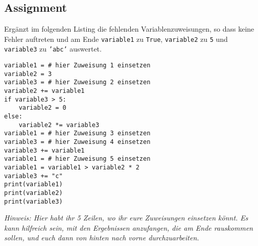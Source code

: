 \subsection{Assignment}
Ergänzt im folgenden Listing die fehlenden Variablenzuweisungen, so dass keine Fehler auftreten und am Ende \texttt{variable1} zu \texttt{True}, \texttt{variable2} zu \texttt{5} und \texttt{variable3} zu \texttt{'abc'} auswertet.
\begin{lstlisting}
variable1 = # hier Zuweisung 1 einsetzen
variable2 = 3
variable3 = # hier Zuweisung 2 einsetzen
variable2 += variable1
if variable3 > 5:
	variable2 = 0
else:
	variable2 *= variable3
variable1 = # hier Zuweisung 3 einsetzen
variable3 = # hier Zuweisung 4 einsetzen
variable3 += variable1
variable1 = # hier Zuweisung 5 einsetzen
variable1 = variable1 > variable2 * 2
variable3 += "c"
print(variable1)
print(variable2)
print(variable3)
\end{lstlisting}

\textit{Hinweis: Hier habt ihr 5 Zeilen, wo ihr eure Zuweisungen einsetzen könnt. Es kann hilfreich sein, mit den Ergebnissen anzufangen, die am Ende rauskommen sollen, und euch dann von hinten nach vorne durchzuarbeiten.}
